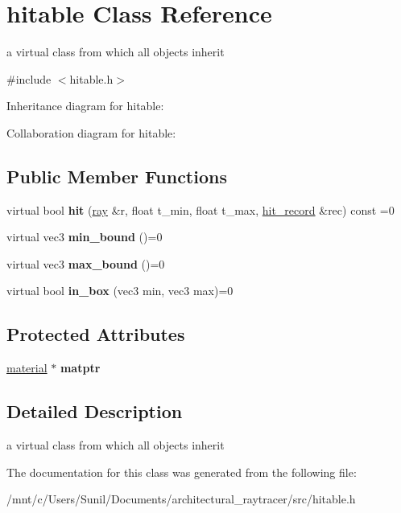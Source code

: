 \hypertarget{classhitable}{}\section{hitable Class Reference}
\label{classhitable}


a virtual class from which all objects inherit  




{\ttfamily \#include $<$hitable.\+h$>$}



Inheritance diagram for hitable\+:


Collaboration diagram for hitable\+:
\subsection*{Public Member Functions}
\begin{DoxyCompactItemize}
\item 
\mbox{\label{classhitable_a266c04b5d3274c9e5eac7d2834bb1342}} 
virtual bool {\bfseries hit} (\hyperlink{classray}{ray} \&r, float t\+\_\+min, float t\+\_\+max, \hyperlink{structhit__record}{hit\+\_\+record} \&rec) const =0
\item 
\mbox{\label{classhitable_ae7cfa0d0445eb013ebe646fb2e4d9877}} 
virtual vec3 {\bfseries min\+\_\+bound} ()=0
\item 
\mbox{\label{classhitable_abd9db9596a4f5bcb765b02ffb31de39c}} 
virtual vec3 {\bfseries max\+\_\+bound} ()=0
\item 
\mbox{\label{classhitable_a02ab6294341e1928ca3d78fca62d0748}} 
virtual bool {\bfseries in\+\_\+box} (vec3 min, vec3 max)=0
\end{DoxyCompactItemize}
\subsection*{Protected Attributes}
\begin{DoxyCompactItemize}
\item 
\mbox{\label{classhitable_aacc372725176a70749477e1a358d9609}} 
\hyperlink{classmaterial}{material} $\ast$ {\bfseries matptr}
\end{DoxyCompactItemize}


\subsection{Detailed Description}
a virtual class from which all objects inherit 

The documentation for this class was generated from the following file\+:\begin{DoxyCompactItemize}
\item 
/mnt/c/\+Users/\+Sunil/\+Documents/architectural\+\_\+raytracer/src/hitable.\+h\end{DoxyCompactItemize}
